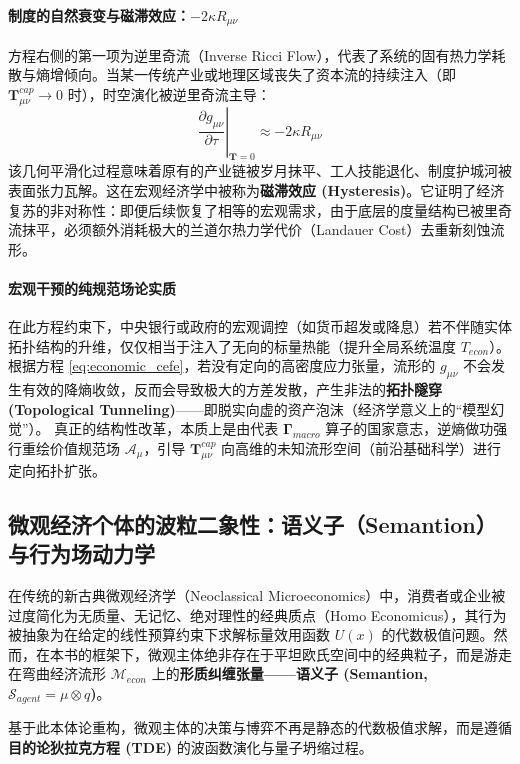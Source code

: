 \paragraph{制度的自然衰变与磁滞效应：$-2\kappa R_{\mu\nu}$}
方程右侧的第一项为逆里奇流（Inverse Ricci Flow），代表了系统的固有热力学耗散与熵增倾向。当某一传统产业或地理区域丧失了资本流的持续注入（即 $\mathbf{T}_{\mu\nu}^{cap} \to 0$ 时），时空演化被逆里奇流主导：
\begin{equation}
    \left. \frac{\partial g_{\mu\nu}}{\partial \tau} \right|_{\mathbf{T}=0} \approx -2\kappa R_{\mu\nu}
\end{equation}
该几何平滑化过程意味着原有的产业链被岁月抹平、工人技能退化、制度护城河被表面张力瓦解。这在宏观经济学中被称为\textbf{磁滞效应 (Hysteresis)}。它证明了经济复苏的非对称性：即便后续恢复了相等的宏观需求，由于底层的度量结构已被里奇流抹平，必须额外消耗极大的兰道尔热力学代价（Landauer Cost）去重新刻蚀流形。

\paragraph{宏观干预的纯规范场论实质}
在此方程约束下，中央银行或政府的宏观调控（如货币超发或降息）若不伴随实体拓扑结构的升维，仅仅相当于注入了无向的标量热能（提升全局系统温度 $T_{econ}$）。根据方程 \ref{eq:economic_cefe}，若没有定向的高密度应力张量，流形的 $g_{\mu\nu}$ 不会发生有效的降熵收敛，反而会导致极大的方差发散，产生非法的\textbf{拓扑隧穿 (Topological Tunneling)}——即脱实向虚的资产泡沫（经济学意义上的“模型幻觉”）。
真正的结构性改革，本质上是由代表 $\mathbf{\Gamma}_{macro}$ 算子的国家意志，逆熵做功强行重绘价值规范场 $\mathcal{A}_\mu$，引导 $\mathbf{T}_{\mu\nu}^{cap}$ 向高维的未知流形空间（前沿基础科学）进行定向拓扑扩张。

\subsection{微观经济个体的波粒二象性：语义子（Semantion）与行为场动力学}
\label{subsec:micro_semantion}

在传统的新古典微观经济学（Neoclassical Microeconomics）中，消费者或企业被过度简化为无质量、无记忆、绝对理性的经典质点（Homo Economicus），其行为被抽象为在给定的线性预算约束下求解标量效用函数 $U(x)$ 的代数极值问题。然而，在本书的框架下，微观主体绝非存在于平坦欧氏空间中的经典粒子，而是游走在弯曲经济流形 $\mathcal{M}_{econ}$ 上的\textbf{形质纠缠张量——语义子 (Semantion, $\mathcal{S}_{agent} = \mu \otimes q$)}。

基于此本体论重构，微观主体的决策与博弈不再是静态的代数极值求解，而是遵循\textbf{目的论狄拉克方程 (TDE)} 的波函数演化与量子坍缩过程。

